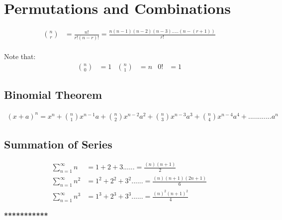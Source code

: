 \section{Permutations and Combinations}
\begin{align}
\binom{n}{r} &= \frac{n!}{r!(n-r)!} = \frac{n(n-1)(n-2)(n-3).....(n-(r+1))}{r!}
\end{align} \\

Note that:
\begin{align*}
\binom{n}{0} &= 1  &  \binom{n}{1} &= n  &  0! &= 1
\end{align*}

\subsection{Binomial Theorem}
\begin{align}
(x+a)^{n} = x^{n} + \binom{n}{1} x^{n-1}a + \binom{n}{2} x^{n-2}a^2 +  \binom{n}{3} x^{n-3}a^3 +  \binom{n}{4} x^{n-4}a^4 + ............ a^n
\end{align}

\subsection{Summation of Series}
\begin{align}
\sum_{n=1}^{\infty} n &= 1+2+3...... = \frac{(n)(n+1)}{2} \\
\sum_{n=1}^{\infty} n^2 &= 1^2+2^2+3^2...... = \frac{(n)(n+1)(2n+1)}{6}\\
\sum_{n=1}^{\infty} n^3 &= 1^3+2^3+3^3...... = \frac{(n)^{2}(n+1)^2}{4}
\end{align}

\vspace{5mm}
\begin{center}
\textbf{***********}
\end{center}